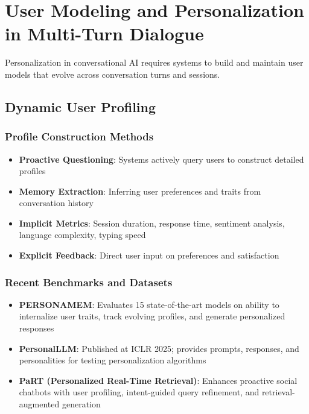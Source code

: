 \documentclass[11pt,letterpaper]{article}
\begin{document}
\section{User Modeling and Personalization in Multi-Turn Dialogue}

Personalization in conversational AI requires systems to build and maintain user models that evolve across conversation turns and sessions.

\subsection{Dynamic User Profiling}

\subsubsection{Profile Construction Methods}
\begin{itemize}[leftmargin=*]
    \item \textbf{Proactive Questioning}: Systems actively query users to construct detailed profiles
    \item \textbf{Memory Extraction}: Inferring user preferences and traits from conversation history
    \item \textbf{Implicit Metrics}: Session duration, response time, sentiment analysis, language complexity, typing speed
    \item \textbf{Explicit Feedback}: Direct user input on preferences and satisfaction
\end{itemize}

\subsubsection{Recent Benchmarks and Datasets}
\begin{itemize}[leftmargin=*]
    \item \textbf{PERSONAMEM}: Evaluates 15 state-of-the-art models on ability to internalize user traits, track evolving profiles, and generate personalized responses
    \item \textbf{PersonalLLM}: Published at ICLR 2025; provides prompts, responses, and personalities for testing personalization algorithms
    \item \textbf{PaRT (Personalized Real-Time Retrieval)}: Enhances proactive social chatbots with user profiling, intent-guided query refinement, and retrieval-augmented generation
\end{itemize}
\end{document}
